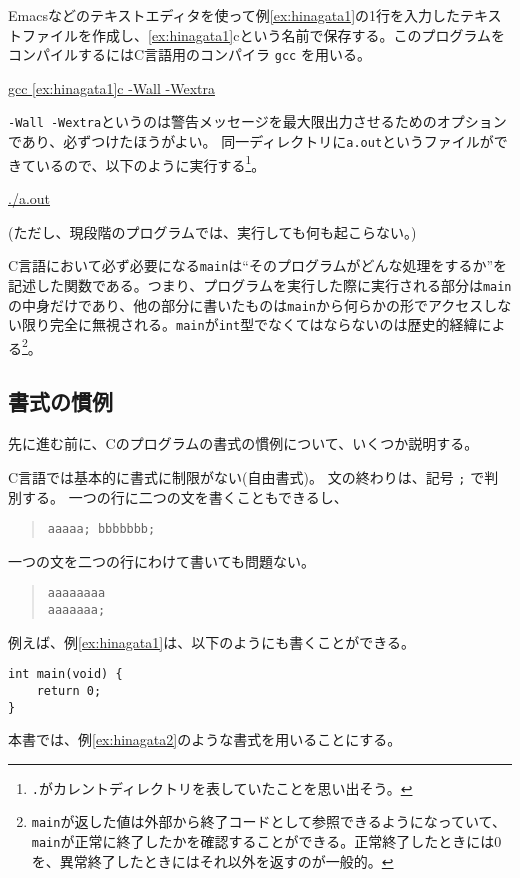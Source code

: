 Emacsなどのテキストエディタを使って例\ref{ex:hinagata1}の1行を入力したテキストファイルを作成し、\ref{ex:hinagata1}cという名前で保存する。このプログラムをコンパイルするにはC言語用のコンパイラ \texttt{gcc} を用いる。
\begin{commandline2}
    \prompt \underline{gcc \ref{ex:hinagata1}c -Wall -Wextra}
\end{commandline2} \noindent
\texttt{-Wall -Wextra}というのは警告メッセージを最大限出力させるためのオプションであり、必ずつけたほうがよい。
同一ディレクトリに\texttt{a.out}というファイルができているので、以下のように実行する\footnote{\texttt{.}がカレントディレクトリを表していたことを思い出そう。}。
\begin{commandline2}
    \prompt \underline{./a.out}
\end{commandline2} \noindent
(ただし、現段階のプログラムでは、実行しても何も起こらない。)

C言語において必ず必要になる\texttt{main}は``そのプログラムがどんな処理をするか''を記述した関数である。つまり、プログラムを実行した際に実行される部分は\texttt{main}の中身だけであり、他の部分に書いたものは\texttt{main}から何らかの形でアクセスしない限り完全に無視される。\texttt{main}が\texttt{int}型でなくてはならないのは歴史的経緯による\footnote{\texttt{main}が返した値は外部から終了コードとして参照できるようになっていて、\texttt{main}が正常に終了したかを確認することができる。正常終了したときには0を、異常終了したときにはそれ以外を返すのが一般的。}。

\subsection{書式の慣例}

先に進む前に、Cのプログラムの書式の慣例について、いくつか説明する。

C言語では基本的に書式に制限がない(自由書式)。
文の終わりは、記号 \texttt{;} で判別する。
一つの行に二つの文を書くこともできるし、
\begin{quote}
\begin{verbatim}
aaaaa; bbbbbbb;
\end{verbatim}
\end{quote}
一つの文を二つの行にわけて書いても問題ない。
\begin{quote}
\begin{verbatim}
aaaaaaaa
aaaaaaa;
\end{verbatim}
\end{quote}
例えば、例\ref{ex:hinagata1}は、以下のようにも書くことができる。
\begin{reidai}\label{ex:hinagata2}
    \begin{verbatim}
int main(void) {
    return 0;
}
\end{verbatim}
\end{reidai} \noindent
本書では、例\ref{ex:hinagata2}のような書式を用いることにする。


